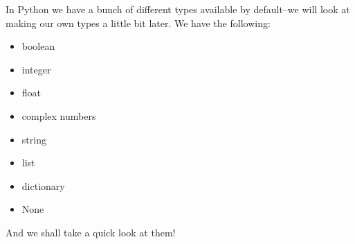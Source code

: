 \documentclass[12pt]{article}
\begin{document}
In Python we have a bunch of different types available by default--we will look at making our own types a little bit later. We have the following:
\begin{itemize} \item boolean\end{itemize}
\begin{itemize} \item integer\end{itemize}
\begin{itemize} \item float\end{itemize}
\begin{itemize} \item complex numbers\end{itemize}
\begin{itemize} \item string\end{itemize}
\begin{itemize} \item list\end{itemize}
\begin{itemize} \item dictionary\end{itemize}
\begin{itemize} \item None\end{itemize}
And we shall take a quick look at them!\\

\\
\end{document}

